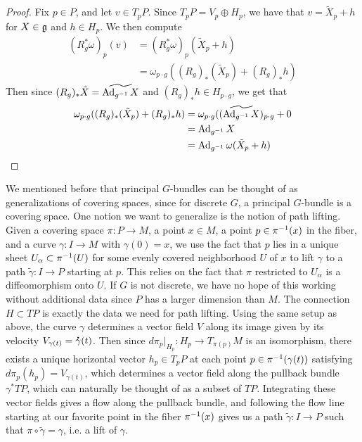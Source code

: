 %
\begin{proof}
Fix $p \in P$, and let $v \in T_pP$. Since $T_pP = V_p \oplus H_p$, we have
that $v = \tilde{X}_p + h$ for $X \in \mathfrak{g}$ and $h \in H_p$. We then compute
\begin{align*}
(R_g^*\omega)_p(v) &= (R_g^*\omega)_p(\tilde{X}_p + h) \\
&= \omega_{p \cdot g}((R_g)_*(\tilde{X}_p ) + (R_g)_*h)
\end{align*}
Then since $(R_g)_*\tilde{X} = \widetilde{\operatorname{Ad}_{g^{-1}}X}$ and
$(R_g)_*h \in H_{p \cdot g}$, we get that
\begin{align*}
\omega_{p \cdot g}((R_g)_*(\tilde{X}_p ) + (R_g)_*h) &=
\omega_{p \cdot g}((\widetilde{\operatorname{Ad}_{g^{-1}}X})_{p\cdot g} + 0 \\
&= \operatorname{Ad}_{g^{-1}} X \\
&= \operatorname{Ad}_{g^{-1}}\omega(\tilde{X}_p + h)
\end{align*}
\end{proof}
%
We mentioned before that principal $G$-bundles can be thought of as
generalizations of covering spaces, since for discrete $G$, a principal $G$-bundle
is a covering space. One notion we want to generalize is the notion of path
lifting. Given a covering space $\pi : P \to M$, a point $x \in M$, a point
$p \in \pi^{-1}(x)$ in the fiber, and a curve $\gamma : I \to M$ with
$\gamma(0) = x$, we use the fact that $p$ lies in a unique sheet
$U_\alpha \subset \pi^{-1}(U)$ for some evenly covered neighborhood $U$ of $x$
to lift $\gamma$ to a path $\tilde{\gamma} : I \to P$ starting at $p$. This relies
on the fact that $\pi$ restricted to $U_\alpha$ is a diffeomorphism onto $U$.
If $G$ is not discrete, we have no hope of this working without additional data
since $P$ has a larger dimension than $M$. The connection $H \subset TP$ is
exactly the data we need for path lifting. Using the same setup as above,
the curve $\gamma$ determines a vector field $V$ along its image given by
its velocity $V_{\gamma(t)} = \accentset{\mbox{\large\bfseries .}}{\gamma}(t)$. Then since
$d\pi_p\vert_{H_p} : H_p \to T_{\pi(p)}M$ is an isomorphism, there exists
a unique horizontal vector $h_p \in T_pP$ at each point $p \in \pi^{-1}(\gamma(t))$
satisfying $d\pi_p(h_p) = V_{\gamma(t)}$, which determines a vector field along
the pullback bundle $\gamma^*TP$, which can naturally be thought of as a subset
of $TP$. Integrating these vector fields gives a flow along the pullback bundle,
and following the flow line starting at our favorite point in the fiber
$\pi^{-1}(x)$ gives us a path $\tilde{\gamma} : I \to P$ such that
$\pi \circ \tilde{\gamma} = \gamma$, i.e. a lift of $\gamma$.
